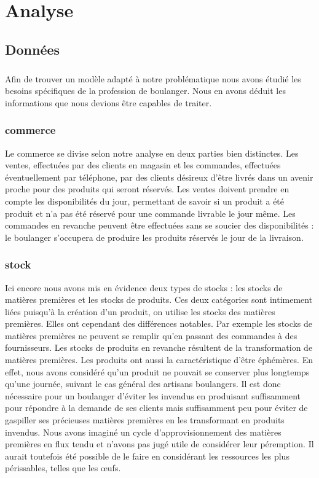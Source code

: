 \chapter{Analyse}

\section{Données}
    \paragraph{}
        Afin de trouver un modèle adapté à notre problématique nous avons étudié
        les besoins spécifiques de la profession de boulanger.
        Nous en avons déduit les informations que nous devions être capables de
        traiter.
    \subsection{commerce}
        Le commerce se divise selon notre analyse en deux parties bien
        distinctes. 
        Les ventes, effectuées par des clients en magasin et les commandes,
        effectuées éventuellement par téléphone, par des clients désireux d'être
        livrés dans un avenir proche pour des produits qui seront réservés.
        Les ventes doivent prendre en compte les disponibilités du jour,
        permettant de savoir si un produit a été produit et n'a pas été réservé
        pour une commande livrable le jour même.
        Les commandes en revanche peuvent être effectuées sans se soucier des 
        disponibilités : le boulanger s'occupera de produire les produits
        réservés le jour de la livraison.
    \subsection{stock}
        Ici encore nous avons mis en évidence deux types de stocks : les stocks
        de matières premières et les stocks de produits. Ces deux catégories 
        sont intimement liées puisqu'à la création d'un produit, on utilise
        les stocks des matières premières. Elles ont cependant des différences
        notables.
        Par exemple les stocks de matières premières ne peuvent se remplir
        qu'en passant des commandes à des fournisseurs.
        Les stocks de produits en revanche résultent de la transformation de
        matières premières.
        Les produits ont aussi la caractéristique d'être éphémères.
        En effet, nous avons considéré qu'un produit ne pouvait se conserver
        plus longtemps qu'une journée, suivant le cas général des artisans 
        boulangers.
        Il est donc nécessaire pour un boulanger d'éviter les invendus en
        produisant suffisamment pour répondre à la demande de ses clients mais
        suffisamment peu pour éviter de gaspiller ses précieuses matières 
        premières en les transformant en produits invendus.
        Nous avons imaginé un cycle d'approvisionnement des matières premières
        en flux tendu et n'avons pas jugé utile de considérer leur péremption.
        Il aurait toutefois été possible de le faire en considérant les
        ressources les plus périssables, telles que les œufs.
